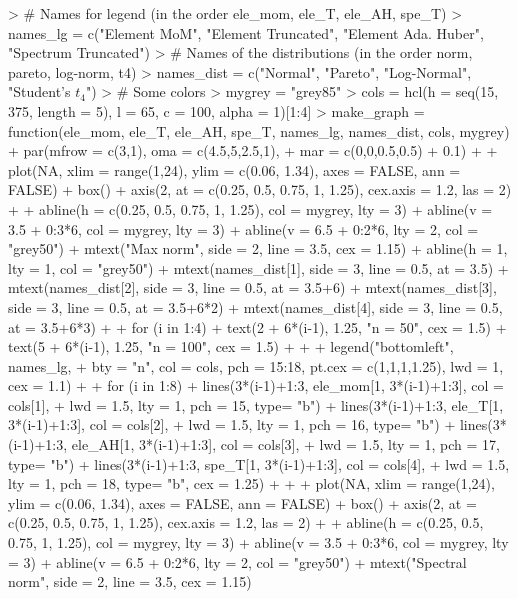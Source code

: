 \documentclass{article}
\begin{document}


\begin{Schunk}
\begin{Sinput}
> # Names for legend (in the order ele_mom, ele_T, ele_AH, spe_T)
> names_lg = c("Element MoM", "Element Truncated", "Element Ada. Huber", "Spectrum Truncated")
> # Names of the distributions (in the order norm, pareto, log-norm, t4)
> names_dist = c("Normal", "Pareto", "Log-Normal", "Student's $t_4$")
> # Some colors
> mygrey = "grey85"
> cols = hcl(h = seq(15, 375, length = 5), l = 65, c = 100, alpha = 1)[1:4]
> make_graph = function(ele_mom, ele_T, ele_AH, spe_T, names_lg, names_dist, cols, mygrey){
+   par(mfrow = c(3,1), oma = c(4.5,5,2.5,1),
+       mar = c(0,0,0.5,0.5) + 0.1)
+ 
+   plot(NA, xlim = range(1,24), ylim = c(0.06, 1.34), axes = FALSE, ann = FALSE)
+   box()
+   axis(2, at = c(0.25, 0.5, 0.75, 1, 1.25), cex.axis = 1.2, las = 2)
+ 
+   abline(h = c(0.25, 0.5, 0.75, 1, 1.25), col = mygrey, lty = 3)
+   abline(v = 3.5 + 0:3*6, col = mygrey, lty = 3)
+   abline(v = 6.5 + 0:2*6, lty = 2, col = "grey50")
+   mtext("Max norm", side = 2, line = 3.5, cex = 1.15)
+   abline(h = 1, lty = 1, col = "grey50")
+   mtext(names_dist[1], side = 3, line = 0.5, at = 3.5)
+   mtext(names_dist[2], side = 3, line = 0.5, at = 3.5+6)
+   mtext(names_dist[3], side = 3, line = 0.5, at = 3.5+6*2)
+   mtext(names_dist[4], side = 3, line = 0.5, at = 3.5+6*3)
+ 
+   for (i in 1:4){
+     text(2 + 6*(i-1), 1.25, "n = 50", cex = 1.5)
+     text(5 + 6*(i-1), 1.25, "n = 100", cex = 1.5)
+   }
+ 
+   legend("bottomleft", names_lg,
+          bty = "n", col = cols, pch = 15:18, pt.cex = c(1,1,1,1.25), lwd = 1, cex = 1.1)
+ 
+   for (i in 1:8){
+     lines(3*(i-1)+1:3, ele_mom[1, 3*(i-1)+1:3], col = cols[1],
+           lwd = 1.5, lty = 1, pch = 15, type= "b")
+     lines(3*(i-1)+1:3, ele_T[1, 3*(i-1)+1:3], col = cols[2],
+           lwd = 1.5, lty = 1, pch = 16, type= "b")
+     lines(3*(i-1)+1:3, ele_AH[1, 3*(i-1)+1:3], col = cols[3],
+           lwd = 1.5, lty = 1, pch = 17, type= "b")
+     lines(3*(i-1)+1:3, spe_T[1, 3*(i-1)+1:3], col = cols[4],
+           lwd = 1.5, lty = 1, pch = 18, type= "b", cex = 1.25)
+   }
+ 
+   plot(NA, xlim = range(1,24), ylim = c(0.06, 1.34), axes = FALSE, ann = FALSE)
+   box()
+   axis(2, at = c(0.25, 0.5, 0.75, 1, 1.25), cex.axis = 1.2, las = 2)
+ 
+   abline(h = c(0.25, 0.5, 0.75, 1, 1.25), col = mygrey, lty = 3)
+   abline(v = 3.5 + 0:3*6, col = mygrey, lty = 3)
+   abline(v = 6.5 + 0:2*6, lty = 2, col = "grey50")
+   mtext("Spectral norm", side = 2, line = 3.5, cex = 1.15)
}
\end{Sinput}
\end{Schunk}
\end{document}
